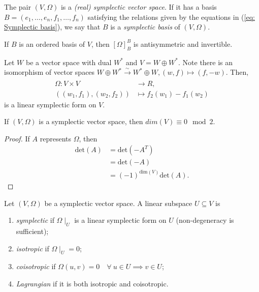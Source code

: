 \begin{Dfn}\label{Dfn: Symplectic vector space}
    The pair $(V,\Omega)$ is a \emph{(real) symplectic vector space}. If it has a basis $B = (e_1,\dots, e_n,f_1,\dots,f_n)$ satisfying the relations given by the equations in (\ref{eq: Symplectic basis}), we say that $B$ is a \emph{symplectic basis} of $(V,\Omega)$.
\end{Dfn}

\begin{Rmk}\label{Rmk: Representation of symplectic forms}
    If $B$ is an ordered basis of $V$, then $[\Omega]_B^B$ is antisymmetric and invertible.
\end{Rmk}

\begin{Exp}
    Let $W$ be a vector space with dual $W^\ast$ and $V=W\oplus W^\ast$. Note there is an isomorphism of vector spaces $W\oplus W^\ast\xrightarrow[]{\sim} W^\ast\oplus W, (w,f)\mapsto (f,-w)$. Then,
    \begin{align*}
        \Omega:V\times V &\to R, \\
        ((w_1,f_1),(w_2,f_2)) &\mapsto f_2(w_1) - f_1(w_2)
    \end{align*}
    is a linear symplectic form on $V$.
\end{Exp}

\begin{Lmm}
    If $(V,\Omega)$ is a symplectic vector space, then ${dim}(V) \equiv 0 \mod 2$.

    \begin{proof}

        If $A$ represents $\Omega$, then
        \begin{align*}
            \text{det}(A) &= \text{det}(-A^T) \\
                          &= \text{det}(-A) \\
                          &= (-1)^{\text{dim}(V)}\text{det}(A).
        \end{align*}
    \end{proof}
\end{Lmm}

\begin{Dfn}\label{Dfn: Symplectic, isotropic, coisotropic and Lagrangian subspaces}
    Let $(V,\Omega)$ be a symplectic vector space. A linear subspace $U\subseteq V$ is
    \begin{enumerate}[label=\DfnLbl]

        \item \emph{symplectic} if $\Omega\mid_U$ is a linear symplectic form on $U$ (non-degeneracy is sufficient);

        \item \emph{isotropic} if $\Omega\mid_U=0$;

        \item \emph{coisotropic} if $\Omega(u,v)=0 \quad \forall \ u\in U \implies v\in U$;

        \item \emph{Lagrangian} if it is both isotropic and coisotropic.
    \end{enumerate}
\end{Dfn}

